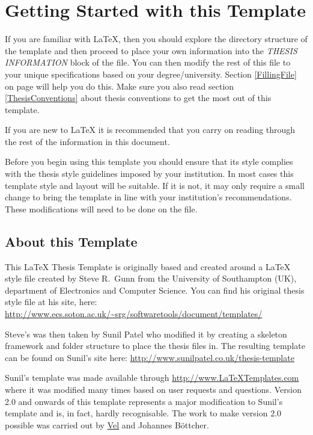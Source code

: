 \section{Getting Started with this Template}

If you are familiar with \LaTeX{}, then you should explore the directory structure of the template and then proceed to place your own information into the \emph{THESIS INFORMATION} block of the  file. You can then modify the rest of this file to your unique specifications based on your degree/university. Section \ref{FillingFile} on page \pageref{FillingFile} will help you do this. Make sure you also read section \ref{ThesisConventions} about thesis conventions to get the most out of this template.

If you are new to \LaTeX{} it is recommended that you carry on reading through the rest of the information in this document.

Before you begin using this template you should ensure that its style complies with the thesis style guidelines imposed by your institution. In most cases this template style and layout will be suitable. If it is not, it may only require a small change to bring the template in line with your institution's recommendations. These modifications will need to be done on the  file.

\subsection{About this Template}

This \LaTeX{} Thesis Template is originally based and created around a \LaTeX{} style file created by Steve R.\ Gunn from the University of Southampton (UK), department of Electronics and Computer Science. You can find his original thesis style file at his site, here:
\url{http://www.ecs.soton.ac.uk/~srg/softwaretools/document/templates/}

Steve's  was then taken by Sunil Patel who modified it by creating a skeleton framework and folder structure to place the thesis files in. The resulting template can be found on Sunil's site here:
\url{http://www.sunilpatel.co.uk/thesis-template}

Sunil's template was made available through \url{http://www.LaTeXTemplates.com} where it was modified many times based on user requests and questions. Version 2.0 and onwards of this template represents a major modification to Sunil's template and is, in fact, hardly recognisable. The work to make version 2.0 possible was carried out by \href{mailto:vel@latextemplates.com}{Vel} and Johannes Böttcher.

